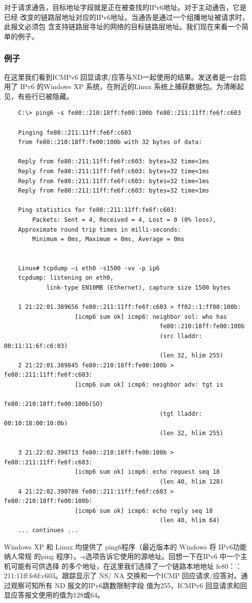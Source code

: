 对于请求通告，目标地址字段就是正在被查找的IPv6地址。对于主动通告，它是已经
改变的链路层地址对应的IPv6地址。当通告是通过一个组播地址被请求时，此报文必须包
含支持链路层寻址的网络的目标链路层地址。我们现在来看一个简单的例子。

\subsubsection{例子}

在这里我们看到ICMPv6 回显请求/应答与ND一起使用的结果。发送者是一台启用了
IPv6 的Windows XP 系统，在附近的Linux 系统上捕获数据包。为清晰起见，有些行已被隐藏。
\begin{verbatim}
	C:\> ping6 -s fe80::210:18ff:fe00:100b fe80::211:11ff:fe6f:c603

	Pinging fe80::211:11ff:fe6f:c603
	from fe80::210:18ff:fe00:100b with 32 bytes of data:

	Reply from fe80::211:11ff:fe6f:c603: bytes=32 time<1ms
	Reply from fe80::211:11ff:fe6f:c603: bytes=32 time<1ms
	Reply from fe80::211:11ff:fe6f:c603: bytes=32 time<1ms
	Reply from fe80::211:11ff:fe6f:c603: bytes=32 time<1ms

	Ping statistics for fe80::211:11ff:fe6f:c603:
		Packets: Sent = 4, Received = 4, Lost = 0 (0% loss),
	Approximate round trip times in milli-seconds:
		Minimum = 0ms, Maximum = 0ms, Average = 0ms


	Linux# tcpdump –i eth0 -s1500 -vv -p ip6
	tcpdump: listening on eth0,
			link-type EN10MB (Ethernet), capture size 1500 bytes

	1 21:22:01.389656 fe80::211:11ff:fe6f:c603 > ff02::1:ff00:100b:
					[icmp6 sum ok] icmp6: neighbor sol: who has
											fe80::210:18ff:fe00:100b
											(src lladdr: 00:11:11:6f:c6:03)
											(len 32, hlim 255)
	2 21:22:01.389845 fe80::210:18ff:fe00:100b > fe80::211:11ff:fe6f:c603:
					[icmp6 sum ok] icmp6: neighbor adv: tgt is
											fe80::210:18ff:fe00:100b(SO)
											(tgt lladdr: 00:10:18:00:10:0b)
											(len 32, hlim 255)

	3 21:22:02.390713 fe80::210:18ff:fe00:100b > fe80::211:11ff:fe6f:c603:
					[icmp6 sum ok] icmp6: echo request seq 18
											(len 40, hlim 128)
	4 21:22:02.390780 fe80::211:11ff:fe6f:c603 > fe80::210:18ff:fe00:100b:
					[icmp6 sum ok] icmp6: echo reply seq 18
											(len 40, hlim 64)
	... continues ...
\end{verbatim}

Windows XP 和 Linux 均提供了 ping6程序（最近版本的 Windows 将 IPv6功能纳人常规
的ping 程序）。-s选项告诉它使用的源地址。回想一下在IPv6 中一个主机可能有可供选择
的多个地址，在这里我们选择了一个链路本地地址 fe80：：211:11ff:fe6f:c603。跟踪显示了 NS/
NA 交换和一个ICMP 回应请求/应答对。通过观察可知所有 ND 报文的IPv6跳数限制字段
值为255，ICMPv6 回显请求和回显应答报文使用的值为128或64。


